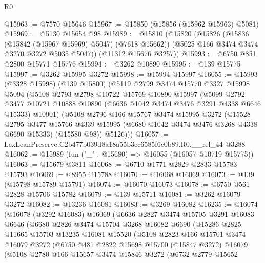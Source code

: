 \begin{lexlean}{R0}
\begin{coremodule}
@15963 := @7570 @15646
@15967 := @15850 (@15856 (@15962 @15963) @5081)
@15969 := @5130 @15654 @98
@15989 := @15810
    (@15820
      (@15826
        (@15836 (@15842 (@15967 @15969) @5047) (@7618 @15662))
        (@5025 @166 @3474 @3474 @3270 @3272 @5035 @5047))
      (@11312 @15676 @3257))
@15993 := @6750 @851 @2800 @15771 @15776
@15994 := @3262 @10890
@15995 := @139 @15775
@15997 := @3262 @15995 @3272
@15998 := @15994 @15997
@16055 := @15993
    (@3328 @15998)
    (@139 @15800)
    (@5119
      @2799
      @3474
      @15770
      @3327
      @15998
      @5094
      (@5108
        @2793
        @2798
        @10722
        @15769
        @10890
        @15997
        (@5099
          @2792
          @3477
          @10721
          @10888
          @10890
          (@6636 @1042 @3474 @3476 @3291 @4338 @6646 @15333)
          @10901)
        (@5108
          @2796
          @166
          @15767
          @3474
          @15995
          @3272
          (@15528
            @2795
            @3477
            @15766
            @4339
            @15995
            (@6680 @1042 @3474 @3476 @3268 @4338 @6690 @15333)
            (@15580 @98))
          @5126)))
@16057 := LexLeanPreserve.C2b477b039d8a18a55b3ec6585f6c0b89.R0.__rel_44 @3288
@16062 := @15989 (fun ("_" : @15680) => @16055 (@16057 @10719 @15775))
@16063 := @15679 @3811
@16068 := @6710 @1771 @2829 @2833 @15783 @15793
@16069 := @8955 @15788
@16070 := @16068 @16069
@16073 := @139 (@15798 @15789 @15791)
@16074 := @16070 @16073
@16078 := @6750 @561 @2828 @15706 @15782
@16079 := @139 @15711
@16081 := @3262 @16079 @3272
@16082 := @13236 @16081
@16083 := @3269 @16082
@16235 := @16074
    (@16078
      (@3292 @16083)
      @16069
      (@6636
        @2827
        @3474
        @15705
        @3291
        @16083
        @6646
        (@6680
          @2826
          @3474
          @15704
          @3268
          @16082
          @6690
          (@15286
            @2825
            @11665
            @15703
            @13235
            @16081
            @15520
            (@5108
              @2823
              @166
              @15701
              @3474
              @16079
              @3272
              (@6750
                @481
                @2822
                @15698
                @15700
                (@15847 @3272)
                @16079
                (@5108
                  @2780
                  @166
                  @15657
                  @3474
                  @15846
                  @3272
                  (@6732
                    @2779
                    @15652

\end{coremodule}
\end{lexlean}
